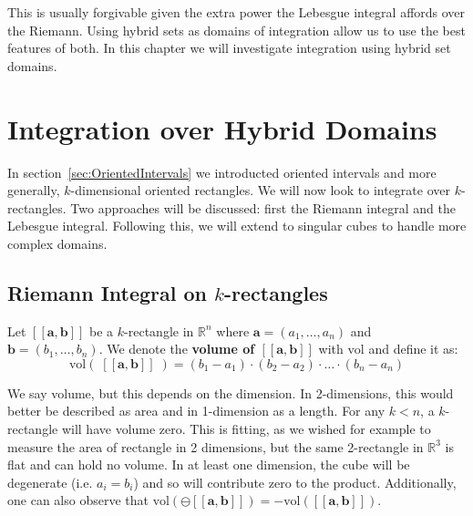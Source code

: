 This is usually forgivable given the extra power the Lebesgue integral affords over the Riemann.
Using hybrid sets as domains of integration allow us to use the best features of both.
In this chapter we will investigate integration using hybrid set domains.






%
%
\section{Integration over Hybrid Domains}

In section~\ref{sec:OrientedIntervals} we introducted oriented intervals and more generally, 
$k$-dimensional oriented rectangles.
We will now look to integrate over $k$-rectangles. 
Two approaches will be discussed: first the Riemann integral and the Lebesgue integral.
Following this, we will extend to singular cubes to handle more complex domains.




\subsection{Riemann Integral on $k$-rectangles}

\begin{definition}
	Let $[\![\boldsymbol{a}, \boldsymbol{b}]\!]$ be a $k$-rectangle in $\mathbb{R}^n$ 
	where $\boldsymbol{a}=(a_1,\ldots, a_n)$ and $\boldsymbol{b}=(b_1,\ldots, b_n)$. 
	We denote the \textbf{volume of $\boldsymbol{[\![a,b]\!]}$} with $\text{vol}$ and define it as:
	\begin{equation}
		\text{vol}(\; [\![\boldsymbol{a}, \boldsymbol{b} ]\!] \;) 
			= (b_1 - a_1) \cdot (b_2 - a_2) \cdot \ldots \cdot (b_n - a_n)
	\end{equation}
\end{definition}

We say volume, but this depends on the dimension.
In 2-dimensions, this would better be described as area and in 1-dimension as a length.
For any $k<n$, a $k$-rectangle will have volume zero.
This is fitting, as we wished for example to measure the area of rectangle in 2 dimensions, but the same 2-rectangle in
$\mathbb{R}^3$ is flat and can hold no volume.
In at least one dimension, the cube will be degenerate (i.e. $a_i = b_i$) and so will contribute zero to the product.
Additionally, one can also observe that $\text{vol}( \ominus [\![\boldsymbol{a}, \boldsymbol{b} ]\!]) 
= - \text{vol}( [\![ \boldsymbol{a}, \boldsymbol{b} ]\!] )$.



